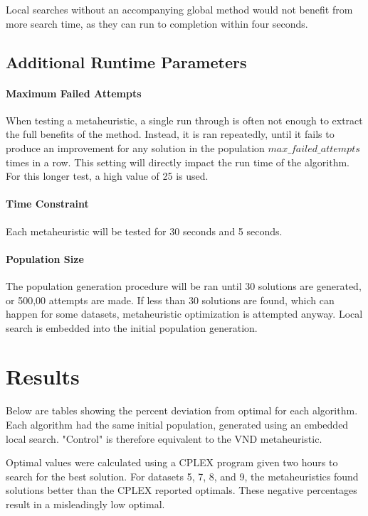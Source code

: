 \documentclass[11pt, letterpaper, onecolumn]{article}
\begin{document}
Local searches without an accompanying global method would not benefit from more search time, as they can run to completion within four seconds. 


\subsection{Additional Runtime Parameters}

\paragraph{Maximum Failed Attempts}

When testing a metaheuristic, a single run through is often not enough to extract the full benefits of the method. Instead, it is ran repeatedly, until it fails to produce an improvement for any solution in the population $max\_failed\_attempts$ times in a row. This setting will directly impact the run time of the algorithm. For this longer test, a high value of 25 is used.

\paragraph{Time Constraint}

Each metaheuristic will be tested for 30 seconds and 5 seconds. 

\paragraph{Population Size}

The population generation procedure will be ran until 30 solutions are generated, or 500,00 attempts are made. If less than 30 solutions are found, which can happen for some datasets, metaheuristic optimization is attempted anyway. Local search is embedded into the initial population generation.

\section{Results}

Below are tables showing the percent deviation from optimal for each algorithm. Each algorithm had the same initial population, generated using an embedded local search. "Control" is therefore equivalent to the VND metaheuristic. 

Optimal values were calculated using a CPLEX program given two hours to search for the best solution. For datasets 5, 7, 8, and 9, the metaheuristics found solutions better than the CPLEX reported optimals. These negative percentages result in a misleadingly low optimal. 
\end{document}
